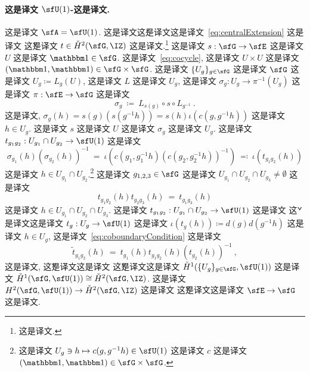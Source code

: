 \documentclass[
    affil-it, %
    auth-lg, %
    british, %
    compression, %
    contents, %
    custom-packages={}, %
    references={bigone}, %
]{lib/preprint}
\begin{document}
\begin{body}
        \paragraph{这是译文 $\sfU(1)$-这是译文.} 这是译文 $\sfA=\sfU(1)$. 这是译文{\'这是译文}这是译文~\eqref{eq:centralExtension} 这是译文 \v 这是译文 $t\in \check H^2(\sfG,\IZ)$ 这是译文.\footnote{这是译文.} 这是译文 $s:\sfG\rightarrow\sfE$ 这是译文 $U$ 这是译文 $\unit\in\sfG$. 这是译文~\eqref{eq:cocycle}, 这是译文 $U\times U$ 这是译文 $(\unit,\unit)\in\sfG\times\sfG$. 这是译文 $\{U_g\}_{g\in\sfG}$ 这是译文 $\sfG$ 这是译文 $U_g\coloneqq L_g(U)$, 这是译文 $L$ 这是译文 $U_g$, 这是译文 $\sigma_g:U_g\rightarrow\pi^{-1}(U_g)$ 这是译文 $\pi:\sfE\rightarrow\sfG$ 这是译文 
        \begin{equation}\label{eq:locSec}
            \sigma_g\ \coloneqq\ L_{s(g)}\circ s\circ L_{g^{-1}}~.
        \end{equation}  这是译文, $\sigma_g(h)=s(g)(s(g^{-1}h))=s(h)\iota(c(g,g^{-1}h))$ 这是译文 $h\in U_g$. 这是译文 $s$ 这是译文 $U$ 这是译文 $\sigma_g$ 这是译文 $U_g$. 这是译文 $t_{g_1g_2}:U_{g_1}\cap U_{g_2}\rightarrow\sfU(1)$ 这是译文 
        \begin{equation}
            \sigma_{g_1}(h)(\sigma_{g_2}(h))^{-1}\ =\ \iota(c(g_1,g_1^{-1}h)(c(g_2,g_2^{-1}h))^{-1})\ \eqqcolon\ \iota(t_{g_1g_2}(h))
        \end{equation}  这是译文 $h\in U_{g_1}\cap U_{g_2}$.\footnote{这是译文 $U_g\ni h\mapsto c(g,g^{-1}h)\in\sfU(1)$ 这是译文 $c$ 这是译文 $(\unit,\unit)\in\sfG\times\sfG$.} 这是译文 $g_{1,2,3}\in\sfG$ 这是译文 $U_{g_1}\cap U_{g_2}\cap U_{g_3}\neq\emptyset$ 这是译文         \begin{equation}
            t_{g_1g_2}(h)t_{g_2g_3}(h)\ =\ t_{g_1g_3}(h)
        \end{equation}  这是译文 $h\in U_{g_1}\cap U_{g_2}\cap U_{g_3}$. 这是译文 $t_{g_1g_2}:U_{g_1}\cap U_{g_2}\rightarrow\sfU(1)$ 这是译文 {\v 这是译文}这是译文 $t_g:U_g\rightarrow\sfU(1)$ 这是译文 $\iota(t_g(h))\coloneqq d(g)d(g^{-1}h)$ 这是译文 $h\in U_g$, 这是译文~\eqref{eq:coboundaryCondition} 这是译文         \begin{equation}
            \tilde t_{g_1g_2}(h)\ =\ t_{g_1}(h)t_{g_1g_2}(h)(t_{g_2}(h))^{-1}~,
        \end{equation}  这是译文, {\v 这是译文}这是译文 {\v 这是译文}这是译文 $\check H^1(\{U_g\}_{g\in\sfG},\sfU(1))$ 这是译文 $\check H^1(\sfG,\sfU(1))\cong\check H^2(\sfG,\IZ)$. 这是译文 $H^2(\sfG,\sfU(1))\rightarrow\check H^2(\sfG,\IZ)$ 这是译文 {\v 这是译文}这是译文 $\sfE\rightarrow\sfG$ 这是译文.  


\end{body}
\end{document}
